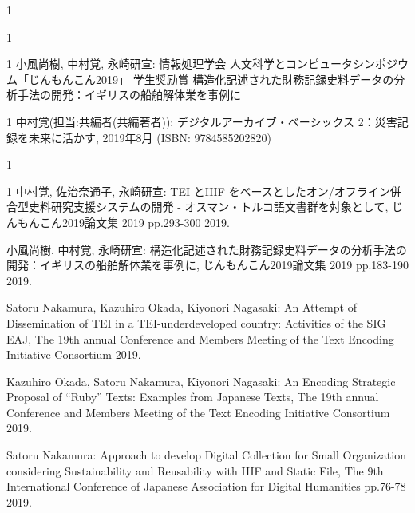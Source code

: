 \begin{招待講演}{1}

\end{招待講演}

\begin{招待論文}{1}

\end{招待論文}

\begin{受賞}{1}
小風尚樹, 中村覚, 永崎研宣:
 情報処理学会 人文科学とコンピュータシンポジウム「じんもんこん2019」 学生奨励賞 構造化記述された財務記録史料データの分析手法の開発：イギリスの船舶解体業を事例に
\end{受賞}

\begin{著書}{1}
中村覚(担当:共編者(共編著者)):
 デジタルアーカイブ・ベーシックス 2：災害記録を未来に活かす, 2019年8月 (ISBN: 9784585202820)
\end{著書}

\begin{雑誌論文}{1}
	
\end{雑誌論文}

\begin{査読付}{1}
中村覚, 佐治奈通子, 永崎研宣:
 TEI とIIIF をベースとしたオン/オフライン併合型史料研究支援システムの開発 - オスマン・トルコ語文書群を対象として,  じんもんこん2019論文集 2019 pp.293-300 2019.

小風尚樹, 中村覚, 永崎研宣:
 構造化記述された財務記録史料データの分析手法の開発：イギリスの船舶解体業を事例に,  じんもんこん2019論文集 2019 pp.183-190 2019.

Satoru Nakamura, Kazuhiro Okada, Kiyonori Nagasaki:
 An Attempt of Dissemination of TEI in a TEI-underdeveloped country: Activities of the SIG EAJ,  The 19th annual Conference and Members Meeting of the Text Encoding Initiative Consortium 2019.

Kazuhiro Okada, Satoru Nakamura, Kiyonori Nagasaki:
 An Encoding Strategic Proposal of “Ruby” Texts: Examples from Japanese Texts,  The 19th annual Conference and Members Meeting of the Text Encoding Initiative Consortium 2019.

Satoru Nakamura:
 Approach to develop Digital Collection for Small Organization considering Sustainability and Reusability with IIIF and Static File,  The 9th International Conference of Japanese Association for Digital Humanities pp.76-78 2019.

\end{査読付}

